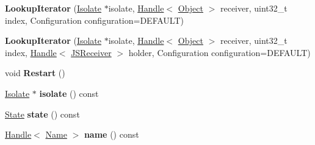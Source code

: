 \begin{DoxyCompactItemize}
\item 
{\bfseries Lookup\+Iterator} (\hyperlink{classv8_1_1internal_1_1_isolate}{Isolate} $\ast$isolate, \hyperlink{classv8_1_1internal_1_1_handle}{Handle}$<$ \hyperlink{classv8_1_1internal_1_1_object}{Object} $>$ receiver, uint32\+\_\+t index, Configuration configuration=D\+E\+F\+A\+U\+LT)\hypertarget{classv8_1_1internal_1_1_b_a_s_e___e_m_b_e_d_d_e_d_aa553c00f1b768076a7363842cb55ba4a}{}\label{classv8_1_1internal_1_1_b_a_s_e___e_m_b_e_d_d_e_d_aa553c00f1b768076a7363842cb55ba4a}

\item 
{\bfseries Lookup\+Iterator} (\hyperlink{classv8_1_1internal_1_1_isolate}{Isolate} $\ast$isolate, \hyperlink{classv8_1_1internal_1_1_handle}{Handle}$<$ \hyperlink{classv8_1_1internal_1_1_object}{Object} $>$ receiver, uint32\+\_\+t index, \hyperlink{classv8_1_1internal_1_1_handle}{Handle}$<$ \hyperlink{classv8_1_1internal_1_1_j_s_receiver}{J\+S\+Receiver} $>$ holder, Configuration configuration=D\+E\+F\+A\+U\+LT)\hypertarget{classv8_1_1internal_1_1_b_a_s_e___e_m_b_e_d_d_e_d_a79491607b2e4037bac1fa0dbc1732f5e}{}\label{classv8_1_1internal_1_1_b_a_s_e___e_m_b_e_d_d_e_d_a79491607b2e4037bac1fa0dbc1732f5e}

\item 
void {\bfseries Restart} ()\hypertarget{classv8_1_1internal_1_1_b_a_s_e___e_m_b_e_d_d_e_d_a267bfda46ca120e07ad7be175c4e6b9e}{}\label{classv8_1_1internal_1_1_b_a_s_e___e_m_b_e_d_d_e_d_a267bfda46ca120e07ad7be175c4e6b9e}

\item 
\hyperlink{classv8_1_1internal_1_1_isolate}{Isolate} $\ast$ {\bfseries isolate} () const \hypertarget{classv8_1_1internal_1_1_b_a_s_e___e_m_b_e_d_d_e_d_a8fd23ecb465f23cd3c60deb9a7bde1f8}{}\label{classv8_1_1internal_1_1_b_a_s_e___e_m_b_e_d_d_e_d_a8fd23ecb465f23cd3c60deb9a7bde1f8}

\item 
\hyperlink{structv8_1_1internal_1_1_b_a_s_e___e_m_b_e_d_d_e_d_1_1_state}{State} {\bfseries state} () const \hypertarget{classv8_1_1internal_1_1_b_a_s_e___e_m_b_e_d_d_e_d_a5bea68dbd070607abd6744b6db27970a}{}\label{classv8_1_1internal_1_1_b_a_s_e___e_m_b_e_d_d_e_d_a5bea68dbd070607abd6744b6db27970a}

\item 
\hyperlink{classv8_1_1internal_1_1_handle}{Handle}$<$ \hyperlink{classv8_1_1internal_1_1_name}{Name} $>$ {\bfseries name} () const \hypertarget{classv8_1_1internal_1_1_b_a_s_e___e_m_b_e_d_d_e_d_aa13520a8d061b80ac8285b87a98fb377}{}\label{classv8_1_1internal_1_1_b_a_s_e___e_m_b_e_d_d_e_d_aa13520a8d061b80ac8285b87a98fb377}


\end{DoxyCompactItemize}
